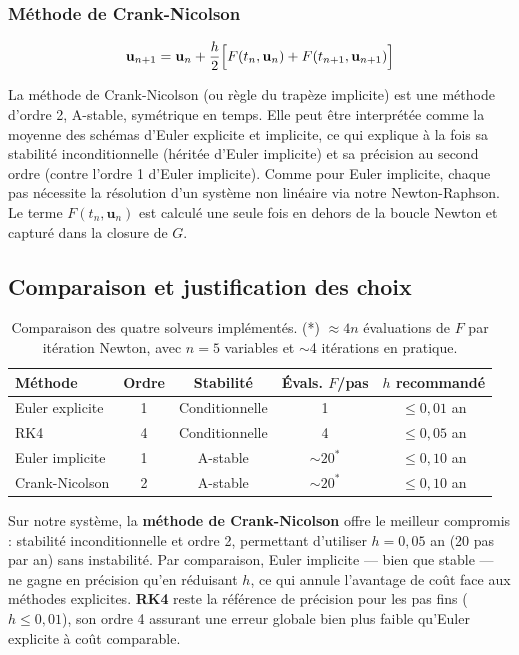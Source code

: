 \documentclass[12pt,a4paper]{article}
\begin{document}
\subsubsection{Méthode de Crank-Nicolson}

\[
\mathbf{u}_{n+1} = \mathbf{u}_n + \frac{h}{2}\Bigl[F(t_n, \mathbf{u}_n) + F(t_{n+1}, \mathbf{u}_{n+1})\Bigr]
\]

La méthode de Crank-Nicolson (ou règle du trapèze implicite) est une méthode d'ordre 2,
A-stable, symétrique en temps. Elle peut être interprétée comme la moyenne des schémas
d'Euler explicite et implicite, ce qui explique à la fois sa stabilité inconditionnelle
(héritée d'Euler implicite) et sa précision au second ordre (contre l'ordre 1 d'Euler
implicite). Comme pour Euler implicite, chaque pas nécessite la résolution d'un système
non linéaire via notre Newton-Raphson. Le terme $F(t_n, \mathbf{u}_n)$ est calculé une
seule fois en dehors de la boucle Newton et capturé dans la closure de $G$.

\subsection{Comparaison et justification des choix}

\begin{table}[h]
\centering
\renewcommand{\arraystretch}{1.3}
\begin{tabular}{lcccc}
\hline
\textbf{Méthode} & \textbf{Ordre} & \textbf{Stabilité} & \textbf{Évals. $F$/pas} & \textbf{$h$ recommandé} \\
\hline
Euler explicite    & 1 & Conditionnelle & 1    & $\leq 0{,}01$ an \\
RK4                & 4 & Conditionnelle & 4    & $\leq 0{,}05$ an \\
Euler implicite    & 1 & A-stable       & $\sim 20^*$ & $\leq 0{,}10$ an \\
Crank-Nicolson     & 2 & A-stable       & $\sim 20^*$ & $\leq 0{,}10$ an \\
\hline
\end{tabular}
\caption{Comparaison des quatre solveurs implémentés. (*) $\approx 4n$ évaluations de $F$
par itération Newton, avec $n=5$ variables et $\sim$4 itérations en pratique.}
\end{table}

Sur notre système, la \textbf{méthode de Crank-Nicolson} offre le meilleur compromis :
stabilité inconditionnelle et ordre 2, permettant d'utiliser $h = 0{,}05$ an (20 pas par
an) sans instabilité. Par comparaison, Euler implicite — bien que stable — ne gagne en
précision qu'en réduisant $h$, ce qui annule l'avantage de coût face aux méthodes
explicites. \textbf{RK4} reste la référence de précision pour les pas fins ($h \leq 0{,}01$),
son ordre 4 assurant une erreur globale bien plus faible qu'Euler explicite à coût comparable.
\end{document}
